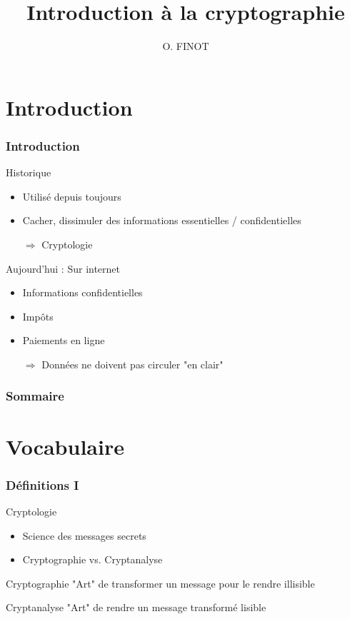 \documentclass[xcolor={dvipsnames}]{beamer}
\title{Introduction à la cryptographie}
\author{O. FINOT}\institute{Lycée S$^t$ Vincent de Paul}
\begin{document}
\begin{frame}
  \titlepage 
\end{frame}

\section{Introduction}

\begin{frame}
\frametitle{Introduction}	
	
	\begin{block}{Historique}
		\begin{itemize}
			\item Utilisé depuis toujours
			\item Cacher, dissimuler des informations essentielles / confidentielles\pause
			\item[$\Rightarrow$] Cryptologie
		\end{itemize}	\pause
	\end{block}
	
	\begin{block}{Aujourd'hui : Sur internet}
		\begin{itemize}
			\item Informations confidentielles
			\item Impôts
			\item Paiements en ligne\pause
			\item[$\Rightarrow$] Données ne doivent pas circuler "en clair"
		\end{itemize}
	\end{block}
	
\end{frame}

\begin{frame}
	\frametitle{Sommaire}
	\tableofcontents[hideallsubsections]
\end{frame} 

\section{Vocabulaire}

\begin{frame}
\frametitle{Définitions I}


	\begin{alertblock}{Cryptologie}
		\begin{itemize}
			\item Science des messages secrets
			\item Cryptographie vs. Cryptanalyse
		\end{itemize}
	\end{alertblock}\pause
	
	\begin{block}{Cryptographie}
		"Art" de transformer un message pour le rendre illisible
	\end{block}\pause
	
	\begin{block}{Cryptanalyse}
		"Art" de rendre un message transformé lisible
	\end{block}
\end{frame}
\end{document}
